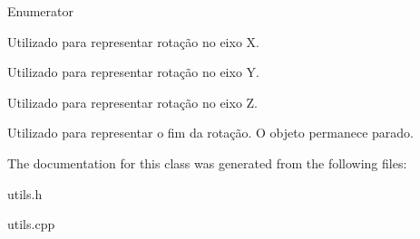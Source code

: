 \begin{Desc}
\item[Enumerator]\par
\begin{description}
\item[{\em 
\hypertarget{class_utils_aa3de9729bf5409b0e8b1e5ab880a8199a4bf372cd116c4baca790987002b5f2d9}{R\+O\+T\+\_\+\+X}\label{class_utils_aa3de9729bf5409b0e8b1e5ab880a8199a4bf372cd116c4baca790987002b5f2d9}
}]Utilizado para representar rotação no eixo X. \item[{\em 
\hypertarget{class_utils_aa3de9729bf5409b0e8b1e5ab880a8199a81f1deb0707619e5ea8dad1e5118c4af}{R\+O\+T\+\_\+\+Y}\label{class_utils_aa3de9729bf5409b0e8b1e5ab880a8199a81f1deb0707619e5ea8dad1e5118c4af}
}]Utilizado para representar rotação no eixo Y. \item[{\em 
\hypertarget{class_utils_aa3de9729bf5409b0e8b1e5ab880a8199abbff5567d18045730a7a27286daad9e5}{R\+O\+T\+\_\+\+Z}\label{class_utils_aa3de9729bf5409b0e8b1e5ab880a8199abbff5567d18045730a7a27286daad9e5}
}]Utilizado para representar rotação no eixo Z. \item[{\em 
\hypertarget{class_utils_aa3de9729bf5409b0e8b1e5ab880a8199a0f2e743cb36bf159477386b1bc5b0957}{R\+O\+T\+\_\+\+S\+T\+O\+P}\label{class_utils_aa3de9729bf5409b0e8b1e5ab880a8199a0f2e743cb36bf159477386b1bc5b0957}
}]Utilizado para representar o fim da rotação. O objeto permanece parado. \end{description}
\end{Desc}


The documentation for this class was generated from the following files\+:\begin{DoxyCompactItemize}
\item 
utils.\+h\item 
utils.\+cpp\end{DoxyCompactItemize}
